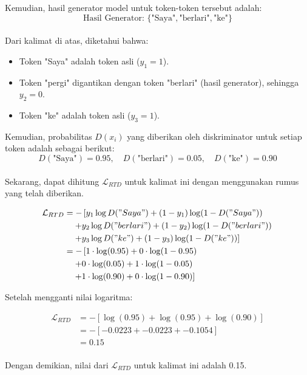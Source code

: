 Kemudian, hasil generator model untuk token-token tersebut adalah:
\\
\[
\text{Hasil Generator: } \{ \text{"Saya"}, \text{"berlari"}, \text{"ke"} \}
\]
\\
Dari kalimat di atas, diketahui bahwa:
\begin{itemize}[noitemsep]
    \item Token "Saya" adalah token asli (\(y_1 = 1\)).
    \item Token "pergi" digantikan dengan token "berlari" (hasil generator), sehingga \(y_2 = 0\).
    \item Token "ke" adalah token asli (\(y_3 = 1\)).
\end{itemize}

Kemudian, probabilitas \(D(x_i)\) yang diberikan oleh diskriminator untuk setiap token adalah sebagai berikut:
\\
\[
D(\text{"Saya"}) = 0.95, \quad D(\text{"berlari"}) = 0.05, \quad D(\text{"ke"}) = 0.90
\]
\\
Sekarang, dapat dihitung \(\mathcal{L}_{RTD}\) untuk kalimat ini dengan menggunakan rumus yang telah diberikan.

\begin{align*}
    \mathcal{L}_{RTD} &= - \left[ y_1 \log D("Saya") + (1 - y_1) \log (1 - D("Saya")) \right. \\
    &\quad \left. + y_2 \log D("berlari") + (1 - y_2) \log (1 - D("berlari")) \right. \\
    &\quad \left. + y_3 \log D("ke") + (1 - y_3) \log (1 - D("ke")) \right] \\
    &= - \left[ 1 \cdot \log(0.95) + 0 \cdot \log(1 - 0.95) \right. \\
    &\quad \left. + 0 \cdot \log(0.05) + 1 \cdot \log(1 - 0.05) \right. \\
    &\quad \left. + 1 \cdot \log(0.90) + 0 \cdot \log(1 - 0.90) \right]\\
\end{align*}

Setelah mengganti nilai logaritma:

\begin{align*}
    \mathcal{L}_{RTD} &= - \left[ \log(0.95) + \log(0.95) + \log(0.90) \right] \\
    &= - \left[ -0.0223 + -0.0223 + -0.1054 \right] \\
    &= 0.15 \\
\end{align*}

Dengan demikian, nilai dari \(\mathcal{L}_{RTD}\) untuk kalimat ini adalah 0.15.

